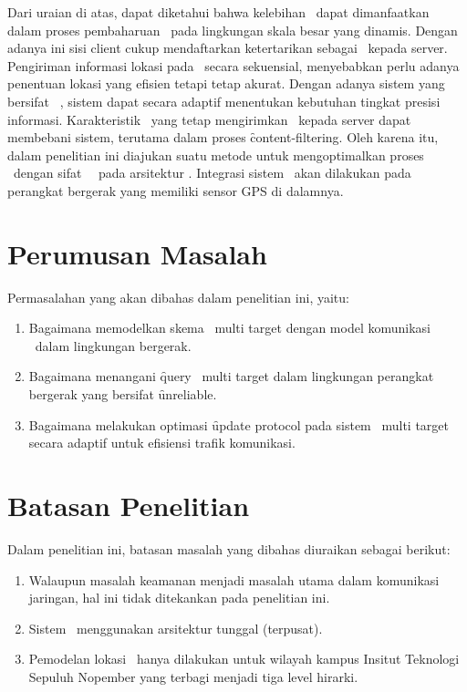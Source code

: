 Dari uraian di atas, dapat diketahui bahwa kelebihan \pubsub~dapat dimanfaatkan
dalam proses pembaharuan \tracking~pada lingkungan skala besar yang dinamis.
Dengan adanya ini sisi client cukup mendaftarkan ketertarikan sebagai
\event~kepada server. Pengiriman informasi lokasi pada \tracking~secara
sekuensial, menyebabkan perlu adanya penentuan lokasi yang efisien tetapi tetap
akurat. Dengan adanya sistem yang bersifat \context~\aware, sistem dapat secara
adaptif menentukan kebutuhan tingkat presisi informasi. Karakteristik
\publisher~yang tetap mengirimkan \event~kepada server dapat membebani sistem,
terutama dalam proses \f{content-filtering}. Oleh karena itu, dalam penelitian
ini diajukan suatu metode untuk mengoptimalkan proses \tracking~dengan sifat
\context~\aware~pada arsitektur \pubsub.  Integrasi sistem \tracking~akan
dilakukan pada perangkat bergerak yang memiliki sensor GPS di dalamnya.

\section{Perumusan Masalah}
Permasalahan yang akan dibahas dalam penelitian ini, yaitu:
\begin{enumerate}
    \item Bagaimana memodelkan skema \tracking~multi target dengan model komunikasi
        \pubsub~dalam lingkungan bergerak.
    \item Bagaimana menangani \f{query} \tracking~multi target dalam lingkungan
        perangkat bergerak yang bersifat \f{unreliable}.
    \item Bagaimana melakukan optimasi \f{update protocol} pada sistem 
        \tracking~multi target secara adaptif untuk efisiensi trafik komunikasi.
\end{enumerate}

\section{Batasan Penelitian}

Dalam penelitian ini, batasan masalah yang dibahas diuraikan sebagai berikut:
\begin{enumerate}
    \item Walaupun masalah keamanan menjadi masalah utama dalam 
        komunikasi jaringan, hal ini tidak ditekankan pada penelitian ini.
    \item Sistem \PubSub~menggunakan arsitektur tunggal (terpusat).
    \item Pemodelan lokasi \tracking~hanya dilakukan untuk wilayah kampus Insitut 
        Teknologi Sepuluh Nopember yang terbagi menjadi tiga level hirarki.
\end{enumerate}


